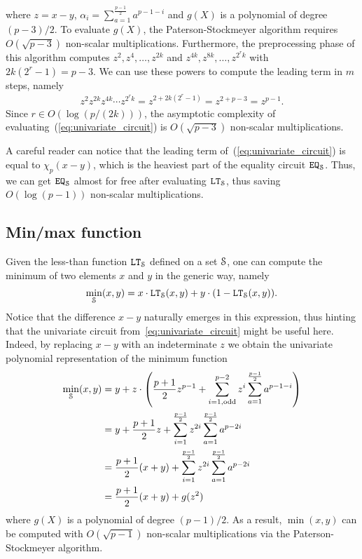   where $z = x - y$, $\alpha_i = \sum_{a=1}^{\frac{p-1}{2}} a^{p-1-i}$ and $g(X)$ is a polynomial of degree $(p-3)/2$.
  To evaluate $g(X)$, the Paterson-Stockmeyer algorithm requires $O(\sqrt{p-3})$ non-scalar multiplications.
  Furthermore, the preprocessing phase of this algorithm computes $z^2, z^4, \dots, z^{2k}$ and $z^{4k}, z^{8k}, \dots, z^{2^r k}$ with $2k(2^r-1) = p-3$.
  We can use these powers to compute the leading term in $m$ steps, namely
  \begin{align*}
    z^2 z^{2k} z^{4k} \cdots z^{2^r k} = z^{2 + 2k(2^r-1)} = z^{2 + p - 3} = z^{p-1}.
  \end{align*}
  Since $r \in O(\log (p/(2k)))$, the asymptotic complexity of evaluating~(\ref{eq:univariate_circuit}) is $O(\sqrt{p-3})$ non-scalar multiplications.
  
  \begin{remark}
    A careful reader can notice that the leading term of~(\ref{eq:univariate_circuit}) is equal to $\chi_p(x-y)$, which is the heaviest part of the equality circuit $\EQ_\S$.
    Thus, we can get $\EQ_\S$ almost for free after evaluating $\LT_\S$, thus saving $O(\log (p-1))$ non-scalar multiplications.
  \end{remark}

\subsection{Min/max function}

  Given the less-than function $\LT_\S$ defined on a set $\S$, one can compute the minimum of two elements $x$ and $y$ in the generic way, namely
  \begin{align*}
    \min_\S(x,y) = x \cdot \LT_\S(x,y) + y \cdot (1 - \LT_\S(x,y)).
  \end{align*}
  Notice that the difference $x - y$ naturally emerges in this expression, thus hinting that the univariate circuit from~\ref{eq:univariate_circuit} might be useful here.
  Indeed, by replacing $x - y$ with an indeterminate $z$ we obtain the univariate polynomial representation of the minimum function 
  \begin{align*}
    \min_\S(x,y) & = y + z \cdot \left(\frac{p+1}{2} z^{p-1} + \sum_{i=1, \text{odd}}^{p-2} z^i \sum_{a=1}^{\frac{p-1}{2}} a^{p-1-i}\right) \\
    & = y + \frac{p+1}{2} z + \sum_{i=1}^{\frac{p-1}{2}} z^{2i} \sum_{a=1}^{\frac{p-1}{2}} a^{p-2i} \\
    & = \frac{p+1}{2} (x+y) + \sum_{i=1}^{\frac{p-1}{2}} z^{2i} \sum_{a=1}^{\frac{p-1}{2}} a^{p-2i} \\
    & = \frac{p+1}{2} (x+y) + g(z^2)
  \end{align*}
  where $g(X)$ is a polynomial of degree $(p-1)/2$. 
  As a result, $\min(x,y)$ can be computed with $O(\sqrt{p-1})$ non-scalar multiplications via the Paterson-Stockmeyer algorithm.

